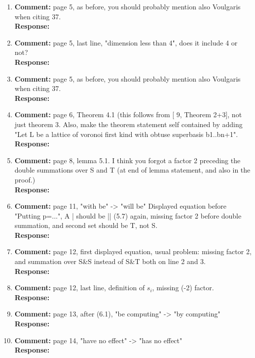 \documentclass[a4paper,10pt]{article}
\begin{document}
\begin{enumerate}
\item\textbf{Comment:}  
page 5, as before, you should probably mention also Voulgaris when citing 37. 
\\\textbf{Response:}

\item\textbf{Comment:}  
page 5, last line, "dimension less than 4", does it include 4 or not? 
\\\textbf{Response:}

\item\textbf{Comment:}  
page 5, as before, you should probably mention also Voulgaris when citing 37. 
\\\textbf{Response:}

\item\textbf{Comment:}  
page 6, Theorem 4.1 (this follows from [ 9, Theorem 2+3], not just theorem 3. 
Also, make the theorem statement self contained by adding "Let L be a lattice of voronoi first kind with obtuse superbasis b1..bn+1". 
\\\textbf{Response:}

\item\textbf{Comment:}  
page 8, lemma 5.1. I think you forgot a factor 2 preceding the double summations over S and T (at end of lemma statement, and also in the proof.) 
\\\textbf{Response:}

\item\textbf{Comment:}  
page 11, "with be" -> "will be" Displayed equation before "Putting p=...", A | should be || 
(5.7) again, missing factor 2 before double summation, and second set should be T, not S. 
\\\textbf{Response:}

\item\textbf{Comment:}  
page 12, first displayed equation, usual problem: missing factor 2, and summation over S\&S instead of S\&T both on line 2 and 3. 
\\\textbf{Response:}

\item\textbf{Comment:}  
page 12, last line, definition of $s_i$, missing (-2) factor. 
\\\textbf{Response:}

\item\textbf{Comment:}  
page 13, after (6.1), "be computing" -> "by computing" 
\\\textbf{Response:}

\item\textbf{Comment:}  
page 14, "have no effect" -> "has no effect" 
\\\textbf{Response:}


\end{enumerate}
\end{document}
